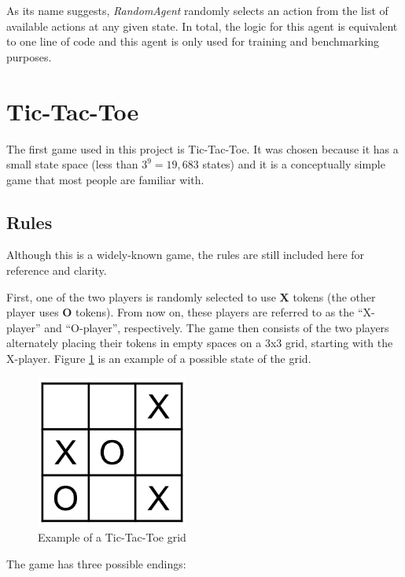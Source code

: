 \documentclass[11pt,a4paper]{report}
\begin{document}
As its name suggests, \emph{RandomAgent} randomly selects an action from the list of available actions at any given state. In total, the logic for this agent is equivalent to one line of code and this agent is only used for training and benchmarking purposes.


\section{Tic-Tac-Toe}

The first game used in this project is Tic-Tac-Toe. It was chosen because it has a small state space (less than $3^9 = 19,683$ states) and it is a conceptually simple game that most people are familiar with.


\subsection{Rules}

Although this is a widely-known game, the rules are still included here for reference and clarity.

First, one of the two players is randomly selected to use \textbf{X} tokens (the other player uses \textbf{O} tokens). From now on, these players are referred to as the ``X-player'' and ``O-player'', respectively. The game then consists of the two players alternately placing their tokens in empty spaces on a 3x3 grid, starting with the X-player. Figure \ref{tic-tac-toe-grid-example} is an example of a possible state of the grid.

\begin{figure}[htbp]
	\begin{center}
		\includegraphics[width=50mm]{tictactoe_grid_example.png}
		\caption{Example of a Tic-Tac-Toe grid\label{tic-tac-toe-grid-example}}
	\end{center}
\end{figure}

The game has three possible endings:
\end{document}
